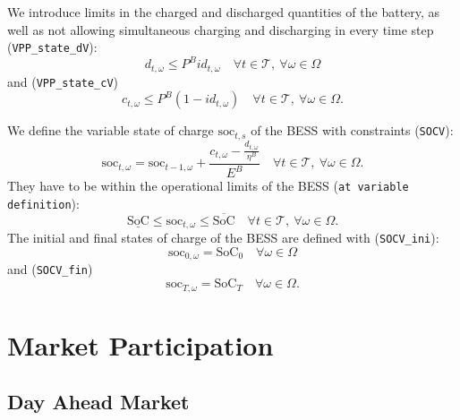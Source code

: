 \documentclass{article}
\newcommand{\SOC}{\text{SoC}}
\newcommand{\soc}{\text{soc}}
\begin{document}
We introduce limits in the charged and discharged quantities of the battery, as well as not allowing simultaneous charging and discharging in every time step (\verb|VPP_state_dV|):
\begin{equation} \label{EQ:VPP_state_dV}
	d_{t, \omega} \leq P^B id_{t, \omega} \quad \forall t \in \mathcal{T}, \ \forall \omega \in \Omega
\end{equation}
and (\verb|VPP_state_cV|)
\begin{equation} \label{EQ:VPP_state_cV}
	c_{t, \omega} \leq P^B (1 - id_{t, \omega}) \quad \forall t \in \mathcal{T}, \ \forall \omega \in \Omega.
\end{equation}

We define the variable state of charge $\soc_{t, s}$ of the BESS with constraints (\verb|SOCV|): 
\begin{equation} \label{EQ:SOCV}
	\soc_{t, \omega} = \soc_{t - 1, \omega} + \frac{c_{t, \omega} - \frac{d_{t, \omega}}{\eta^B}}{E^B} \quad \forall t \in \mathcal{T}, \ \forall \omega \in \Omega. 
\end{equation} 
They have to be within the operational limits of the BESS (\verb|at variable definition|):
\begin{equation} \label{EQ:socVOperLimits}
	\underline{\SOC} \leq \soc_{t, \omega} \leq \overline{\SOC} \quad \forall t \in \mathcal{T}, \ \forall \omega \in \Omega.
\end{equation}
The initial and final states of charge of the BESS are defined with (\verb|SOCV_ini|):
\begin{equation} \label{EQ:SOCV_ini}
	\soc_{0, \omega} = \SOC_0 \quad \forall \omega \in \Omega
\end{equation}
and (\verb|SOCV_fin|)
\begin{equation} \label{EQ:SOCV_fin}
	\soc_{T, \omega} = \SOC_T \quad \forall \omega \in \Omega.
\end{equation}



\section{Market Participation}
\label{SEC:MarketParticipation}

\subsection{Day Ahead Market}
\end{document}

